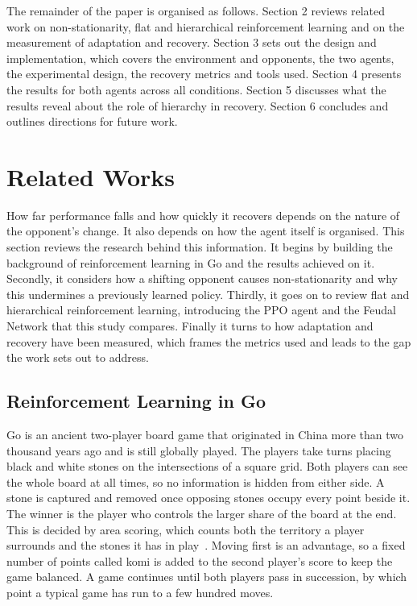 \documentclass[sigconf,nonacm]{acmart}
\begin{document}
The remainder of the paper is organised as follows. Section 2 reviews related
work on non-stationarity, flat and hierarchical reinforcement learning and on
the measurement of adaptation and recovery. Section 3 sets out the design and
implementation, which covers the environment and opponents, the two agents, the
experimental design, the recovery metrics and tools used. Section 4 presents the results for
both agents across all conditions. Section 5 discusses what the results reveal about
the role of hierarchy in recovery. Section 6 concludes and outlines directions
for future work.



\section{Related Works}

How far performance falls and how quickly it recovers depends on the nature of the opponent's change. It also depends on how the agent itself is organised. This section reviews the research behind this information. It begins by building the background of reinforcement learning in Go and the results achieved on it. Secondly, it considers how a shifting opponent causes non-stationarity
and why this undermines a previously learned policy. Thirdly, it goes on to review flat
and hierarchical reinforcement learning, introducing the PPO agent and the Feudal
Network that this study compares. Finally it turns to how adaptation and recovery
have been measured, which frames the metrics used and leads to the gap the work sets out to address.

\subsection{Reinforcement Learning in Go}
Go is an ancient two-player board game that originated in China more than two
thousand years ago and is still globally played. The players take turns placing
black and white stones on the intersections of a square grid. Both players can see the whole board at all times, so no
information is hidden from either side. A stone is captured and removed once opposing stones occupy every point beside it. The winner is the
player who controls the larger share of the board at the end. This is decided by
area scoring, which counts both the territory a player surrounds and the stones
it has in play~\cite{silver2016mastering}. Moving first is an advantage, so a
fixed number of points called komi is added to the second player's score to keep
the game balanced. A game continues until both players pass in succession, by which point a typical game has run to a few hundred moves.
\end{document}
